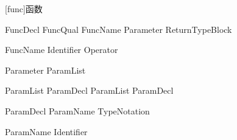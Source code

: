
[func]{函数}

\begin{bnf}{FuncDecl}
    FuncQual\bnfs {} FuncName Parameter ReturnType\bnfq Block
\end{bnf}

\begin{bnf}{FuncName}
    Identifier \br
     \br
     \br
     Operator
\end{bnf}

\begin{bnf}{Parameter}
    \terminal{(} ParamList\bnfq \terminal{)}
\end{bnf}

\begin{bnf}{ParamList}
    ParamDecl \br
    ParamList \terminal{,} ParamDecl
\end{bnf}

\begin{bnf}{ParamDecl}
    ParamName TypeNotation\bnfq
\end{bnf}

\begin{bnf}{ParamName}
    Identifier \br
\end{bnf}